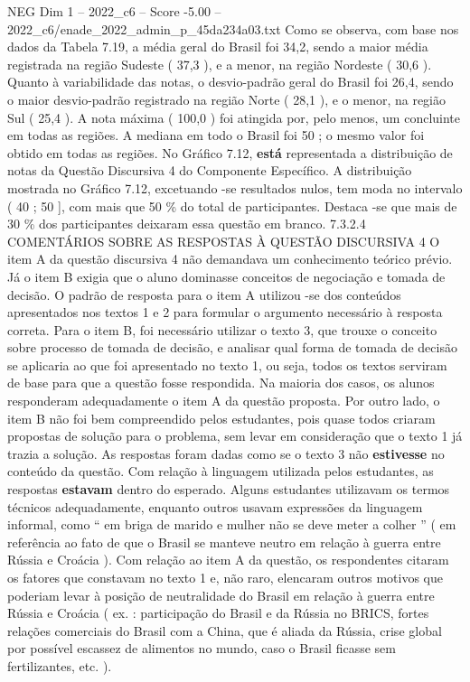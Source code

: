 \begin{textsample}{NEG Dim 1 – 2022\_c6 – Score -5.00 – 2022\_c6/enade\_2022\_admin\_p\_45da234a03.txt}
Como se observa, com base nos dados da Tabela 7.19, a média geral do Brasil foi 34,2, sendo a maior média registrada na região Sudeste ( 37,3 ), e a menor, na região Nordeste ( 30,6 ).
Quanto à variabilidade das notas, o desvio-padrão geral do Brasil foi 26,4, sendo o maior desvio-padrão registrado na região Norte ( 28,1 ), e o menor, na região Sul ( 25,4 ).
A nota máxima ( 100,0 ) foi atingida por, pelo menos, um concluinte em todas as regiões.
A mediana em todo o Brasil foi 50 ; o mesmo valor foi obtido em todas as regiões.
No Gráfico 7.12, \textbf{está} representada a distribuição de notas da Questão Discursiva 4 do Componente Específico.
A distribuição mostrada no Gráfico 7.12, excetuando -se resultados nulos, tem moda no intervalo ( 40 ; 50 ], com mais que 50 \% do total de participantes.
Destaca -se que mais de 30 \% dos participantes deixaram essa questão em branco. 7.3.2.4 COMENTÁRIOS SOBRE AS RESPOSTAS À QUESTÃO DISCURSIVA 4 O item A da questão discursiva 4 não demandava um conhecimento teórico prévio.
Já o item B exigia que o aluno dominasse conceitos de negociação e tomada de decisão.
O padrão de resposta para o item A utilizou -se dos conteúdos apresentados nos textos 1 e 2 para formular o argumento necessário à resposta correta.
Para o item B, foi necessário utilizar o texto 3, que trouxe o conceito sobre processo de tomada de decisão, e analisar qual forma de tomada de decisão se aplicaria ao que foi apresentado no texto 1, ou seja, todos os textos serviram de base para que a questão fosse respondida.
Na maioria dos casos, os alunos responderam adequadamente o item A da questão proposta.
Por outro lado, o item B não foi bem compreendido pelos estudantes, pois quase todos criaram propostas de solução para o problema, sem levar em consideração que o texto 1 já trazia a solução.
As respostas foram dadas como se o texto 3 não \textbf{estivesse} no conteúdo da questão.
Com relação à linguagem utilizada pelos estudantes, as respostas \textbf{estavam} dentro do esperado.
Alguns estudantes utilizavam os termos técnicos adequadamente, enquanto outros usavam expressões da linguagem informal, como “ em briga de marido e mulher não se deve meter a colher ” ( em referência ao fato de que o Brasil se manteve neutro em relação à guerra entre Rússia e Croácia ).
Com relação ao item A da questão, os respondentes citaram os fatores que constavam no texto 1 e, não raro, elencaram outros motivos que poderiam levar à posição de neutralidade do Brasil em relação à guerra entre Rússia e Croácia ( ex. : participação do Brasil e da Rússia no BRICS, fortes relações comerciais do Brasil com a China, que é aliada da Rússia, crise global por possível escassez de alimentos no mundo, caso o Brasil ficasse sem fertilizantes, etc. ).

\end{textsample}
